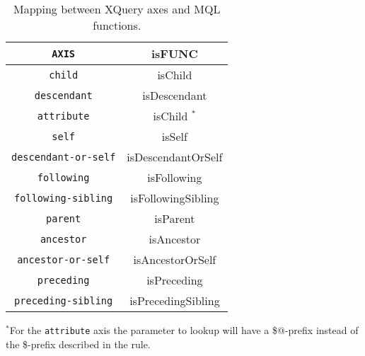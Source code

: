 \begin{table}[h]
\centering
\begin{tabular}{c|c}
\texttt{AXIS} & \textsf{isFUNC} \\ \hline
\texttt{child} & \textsf{isChild} \\
\texttt{descendant} & \textsf{isDescendant} \\
\texttt{attribute} & \textsf{isChild} $^{*}$ \\
\texttt{self} & \textsf{isSelf} \\
\texttt{descendant-or-self} & \textsf{isDescendantOrSelf} \\
\texttt{following} & \textsf{isFollowing} \\
\texttt{following-sibling} & \textsf{isFollowingSibling} \\
\texttt{parent} & \textsf{isParent} \\
\texttt{ancestor} & \textsf{isAncestor} \\
\texttt{ancestor-or-self} & \textsf{isAncestorOrSelf} \\
\texttt{preceding} & \textsf{isPreceding} \\
\texttt{preceding-sibling} & \textsf{isPrecedingSibling} 
\end{tabular}
\caption{Mapping between XQuery axes and MQL functions. \label{tab:trans:TD:axisMap}}
\end{table}

$^{*}$For the \texttt{attribute} axis the parameter to \textsf{lookup} will have a \textsf{\$@}-prefix
instead of the \textsf{\$}-prefix described in the rule.

